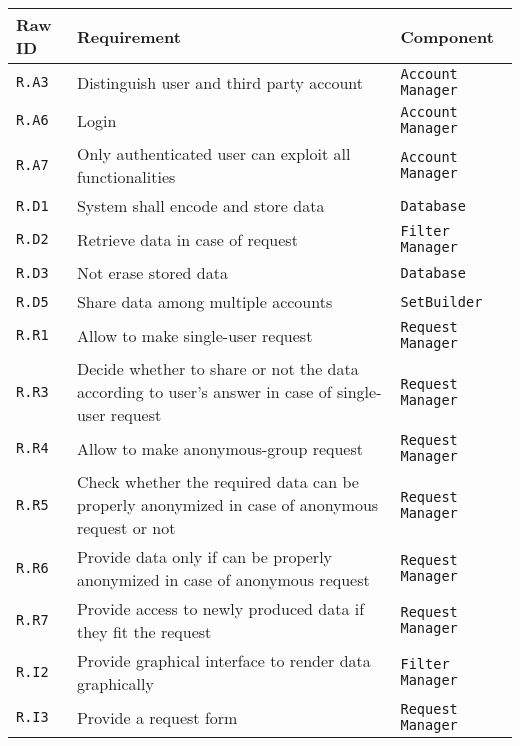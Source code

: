 \documentclass[../DD0.tex]{subfiles}
\begin{document}
    \begin{table}[h!]

      \centering
      \begin{tabularx}{.8\linewidth}{|X|X|X|}
        \hline
        \textbf{Raw ID} & \textbf{Requirement} & \textbf{Component} \\ \hline
        \texttt{R.A3} & Distinguish user and third party account & \texttt{Account Manager} \\
        \hline
        \texttt{R.A6} & Login & \texttt{Account Manager} \\
        \hline
        \texttt{R.A7} & Only authenticated user can exploit all functionalities & \texttt{Account Manager} \\
        \hline
        \texttt{R.D1}  & System shall encode and store data & \texttt{Database} \\
        \hline
        \texttt{R.D2}  &  Retrieve data in case of request & \texttt{Filter Manager} \\
        \hline
        \texttt{R.D3}  &  Not erase stored data & \texttt{Database} \\
        \hline
        \texttt{R.D5}  & Share data among multiple accounts & \texttt{SetBuilder} \\
        \hline
        \texttt{R.R1}  & Allow to make single-user request & \texttt{Request Manager} \\
        \hline
        \texttt{R.R3}  & Decide whether to share or not the data according to user's answer in case of single-user request & \texttt{Request Manager} \\
        \hline
        \texttt{R.R4}  & Allow to make anonymous-group request & \texttt{Request Manager} \\
        \hline
        \texttt{R.R5}  & Check whether the required data can be properly anonymized in case of anonymous request or not & \texttt{Request Manager} \\
        \hline
        \texttt{R.R6} & Provide data only if can be properly anonymized in case of anonymous request & \texttt{Request Manager}\\
        \hline 
        \texttt{R.R7} & Provide access to newly produced data if they fit the request & \texttt{Request Manager} \\
        \hline
        \texttt{R.I2} & Provide graphical interface to render data graphically & \texttt{Filter Manager} \\
        \hline
        \texttt{R.I3} & Provide a request form &\texttt{Request Manager} \\
        \hline
      \end{tabularx}
      \label{tab:automatedtp}
    \end{table}
\end{document}
